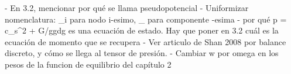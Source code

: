 - En 3.2, mencionar por qu\'e se llama pseudopotencial
- Uniformizar nomenclatura: _i para nodo i-esimo, _{\alpha} para componente {\alpha-}esima
- por qu\'e p = \rho c_s^2 + G/ggdg es una ecuaci\'on de estado. Hay que poner en 3.2 cu\'al es la ecuaci\'on de momento que se recupera
- Ver articulo de Shan 2008 por balance discreto, y c\'omo se llega al tensor de presi\'on.
- Cambiar w por omega en los pesos de la funcion de equilibrio del cap\'itulo 2